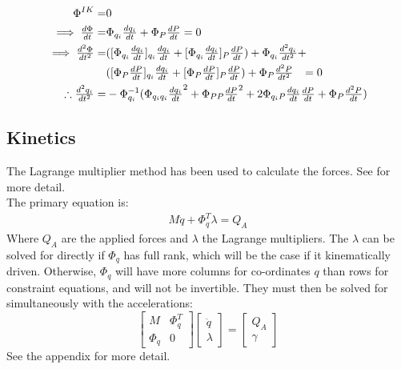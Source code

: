 \begin{align}
\Phi^{IK} =& 0  \nonumber \\
\implies \tfrac{d\Phi}{dt} =&\Phi_{q_i} \tfrac{dq_i}{dt}+\Phi_{P} \tfrac{dP}{dt}  =0\\
\implies 
\tfrac{d^2\Phi}{dt^2} =&([\Phi_{q_i}\tfrac{dq_i}{dt}]_{q_i}\tfrac{dq_i}{dt}+[\Phi_{q_i}\tfrac{dq_i}{dt}]_{P}\tfrac{dP}{dt})+\Phi_{q_i}\tfrac{d^2q_i}{dt^2}+ \nonumber\\
                           &([\Phi_{P}\tfrac{dP}{dt}]_{q_i}\tfrac{dq_i}{dt}+[\Phi_{P}\tfrac{dP}{dt}]_{P}\tfrac{dP}{dt})+\Phi_{P}\tfrac{d^2P}{dt^2}\hphantom{+}=0\\
\therefore  \tfrac{d^2q_i}{dt^2}=&-\Phi_{q_i}^{-1} (\Phi_{q_iq_i}\tfrac{dq_i}{dt}^2+\Phi_{PP}\tfrac{dP}{dt}^2+2\Phi_{q_iP}\tfrac{dq_i}{dt}\tfrac{dP}{dt}+\Phi_P\tfrac{d^2P}{dt}) \label{eq:gammaIK}
\end{align}

\subsection{Kinetics}
The Lagrange multiplier method has been used to calculate the forces. See \cite{Schilder2018} for more detail.\\

The primary equation is:
\begin{eqnarray}
M\ddot{q}+\Phi_q^T\lambda=Q_A \label{eq:lambda}
\end{eqnarray}
Where $Q_A$ are the applied forces and $\lambda$ the Lagrange multipliers. The $\lambda$ can be solved for directly if $\Phi_q$ has full rank, which will be the case if it kinematically driven. Otherwise, $\Phi_q$ will have more columns for co-ordinates $q$ than rows for constraint equations, and will not be invertible. They must then be solved for simultaneously with the accelerations:
\begin{equation}
\begin{bmatrix}
M &\Phi_q^T \\
\Phi_q &0
\end{bmatrix}
\begin{bmatrix}
\ddot{q} \\
\lambda
\end{bmatrix}
=
\begin{bmatrix}
Q_A \\
\gamma
\end{bmatrix} \label{eq:EoM}
\end{equation}
See the appendix for more detail.\\

